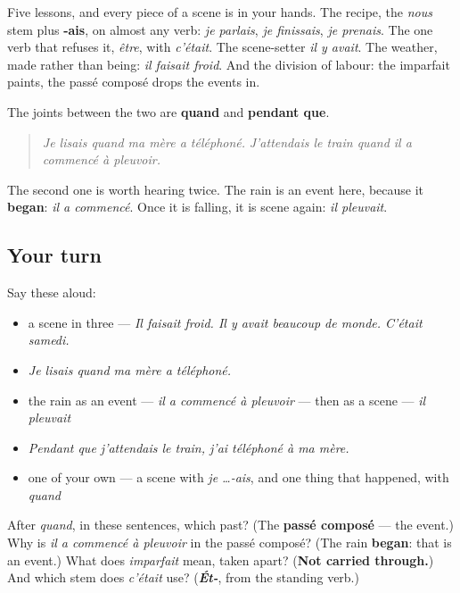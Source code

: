 \begin{grammarlens}[title={What you've built}]
Five lessons, and every piece of a scene is in your hands. The recipe, the \emph{nous} stem plus \textbf{-ais}, on almost any verb: \emph{je parlais}, \emph{je finissais}, \emph{je prenais}. The one verb that refuses it, \emph{être}, with \emph{c'était}. The scene-setter \emph{il y avait}. The weather, made rather than being: \emph{il faisait froid}. And the division of labour: the imparfait paints, the passé composé drops the events in.

The joints between the two are \textbf{quand} and \textbf{pendant que}.

\begin{quote}
\emph{Je lisais quand ma mère a téléphoné.} \emph{J'attendais le train quand il a commencé à pleuvoir.}
\end{quote}

The second one is worth hearing twice. The rain is an event here, because it \textbf{began}: \emph{il a commencé}. Once it is falling, it is scene again: \emph{il pleuvait}.
\end{grammarlens}

\subsection*{Your turn}
Say these aloud:

\begin{itemize}
\raggedright
  \item a scene in three — \emph{Il faisait froid. Il y avait beaucoup de monde. C'était samedi.}
  \item \emph{Je lisais quand ma mère a téléphoné.}
  \item the rain as an event — \emph{il a commencé à pleuvoir} — then as a scene — \emph{il pleuvait}
  \item \emph{Pendant que j'attendais le train, j'ai téléphoné à ma mère.}
  \item one of your own — a scene with \emph{je …-ais}, and one thing that happened, with \emph{quand}
\end{itemize}

\begin{tcolorbox}[breakable,colback=teal!4,colframe=teal!35!black,title={Before you move on}]
After \emph{quand}, in these sentences, which past? (The \textbf{passé composé} — the event.) Why is \emph{il a commencé à pleuvoir} in the passé composé? (The rain \textbf{began}: that is an event.) What does \emph{imparfait} mean, taken apart? (\textbf{Not carried through.}) And which stem does \emph{c'était} use? (\emph{\textbf{Ét-}}, from the standing verb.)
\end{tcolorbox}
